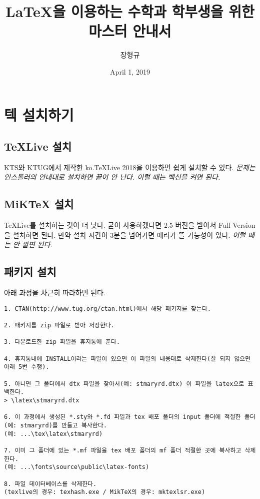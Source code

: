 \documentclass[11pt]{article} %
\title{\LaTeX{}을 이용하는 수학과 학부생을 위한 마스터 안내서}
\author{장형규}
\date{April 1, 2019}
\begin{document}
\maketitle

\section{텍 설치하기}

\subsection{\TeX{}Live 설치}

KTS와 KTUG에서 제작한 ko.TeXLive 2018을 이용하면 쉽게 설치할 수 있다.  \emph{문제는 인스톨러의 안내대로 설치하면 끝이 안 난다. 이럴 때는 백신을 켜면 된다.}

\subsection{MiK\TeX{} 설치}
\TeX{}Live를 설치하는 것이 더 낫다. 굳이 사용하겠다면 2.5 버전을 받아서 Full Version을 설치하면 된다. 만약 설치 시간이 3분을 넘어가면 에러가 뜰 가능성이 있다. \emph{이럴 때는 안 깔면 된다.}

\subsection{패키지 설치}
아래 과정을 차근히 따라하면 된다.

\begin{verbatim}
1. CTAN(http://www.tug.org/ctan.html)에서 해당 패키지를 찾는다.

2. 패키지를 zip 파일로 받아 저장한다.

3. 다운로드한 zip 파일을 휴지통에 푼다.

4. 휴지통내에 INSTALL이라는 파일이 있으면 이 파일의 내용대로 삭제한다(잘 되지 않으면 아래 5번 수행).

5. 아니면 그 폴더에서 dtx 파일을 찾아서(예: stmaryrd.dtx) 이 파일을 latex으로 표백한다.
> \latex\stmaryrd.dtx

6. 이 과정에서 생성된 *.sty와 *.fd 파일과 tex 배포 폴더의 input 폴더에 적절한 폴더(예: stmaryrd)를 만들고 복사한다.
(예: ...\tex\latex\stmaryrd)

7. 이미 그 폴더에 있는 *.mf 파일을 tex 배포 폴더의 mf 폴더 적절한 곳에 복사하고 삭제한다.
(예: ...\fonts\source\public\latex-fonts)

8. 파일 데이터베이스를 삭제한다.
(texlive의 경우: texhash.exe / MikTeX의 경우: mktexlsr.exe)
\end{verbatim}
\end{document}
